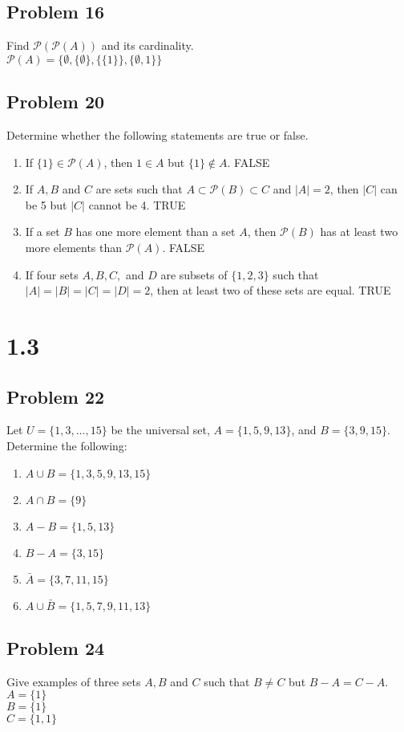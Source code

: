 \documentclass{article}
\newcommand\power[1]{\mathcal{P}(#1)}
\begin{document}
	\subsection*{Problem 16}
	Find $\mathcal{P}(\mathcal{P}(A))$ and its cardinality.\\
	$\mathcal{P}(A)=\{\emptyset,\{\emptyset\},\{\{1\}\},\{\emptyset, 1\}\}$
	\subsection*{Problem 20}
	Determine whether the following statements are true or false.
	\begin{enumerate}[label=(\alph*)]
		\item If $\{1\}\in\power{A}$, then $1\in A$ but $\{1\}\notin A$. FALSE
		\item If $A,B$ and $C$ are sets such that $A\subset\power{B}\subset C$ and $|A|=2$, then $|C|$ can be 5 but $|C|$ cannot be 4. TRUE
		\item If a set $B$ has one more element than a set $A$, then $\power{B}$ has at least two more elements than $\power{A}$. FALSE
		\item If four sets $A,B,C,$ and $D$ are subsets of $\{1,2,3\}$ such that $|A|=|B|=|C|=|D|=2$, then at least two of these sets are equal. TRUE
	\end{enumerate}
	
	\section*{1.3}
	\subsection*{Problem 22}
	Let $U=\{1,3,\dotsc,15\}$ be the universal set, $A=\{1,5,9,13\}$, and $B=\{3,9,15\}$. Determine the following:
	\begin{enumerate}[label=(\alph*)]
		\item $A\cup B=\{1,3,5,9,13,15\}$
		\item $A\cap B=\{9\}$
		\item $A-B=\{1,5,13\}$
		\item $B-A=\{3,15\}$
		\item $\bar{A}=\{3,7,11,15\}$
		\item $A\cup\bar{B}=\{1,5,7,9,11,13\}$
	\end{enumerate} 
	\subsection*{Problem 24}
	Give examples of three sets $A,B$ and $C$ such that $B\neq C$ but $B-A=C-A$.\\
	$A=\{1\}$\\
	$B=\{1\}$\\
	$C=\{1,1\}$
\end{document}
